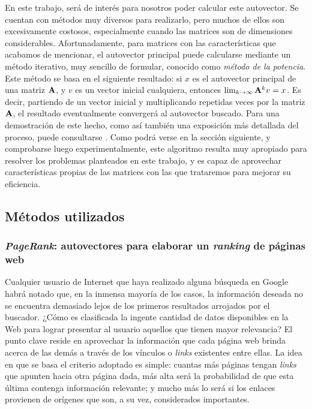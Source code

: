         En este trabajo, será de interés para nosotros poder calcular este autovector. Se cuentan con métodos muy diversos para realizarlo, pero muchos de ellos son excesivamente costosos, especialmente cuando las matrices son de dimensiones considerables. Afortunadamente, para matrices con las características que acabamos de mencionar, el autovector principal puede calcularse mediante un método iterativo, muy sencillo de formular, conocido como \emph{método de la potencia}. Este método se basa en el siguiente resultado: si $x$ es el autovector principal de una matriz $\mathbf{A}$, y $v$ es un vector inicial cualquiera, entonces $\lim_{k\to\infty}\mathbf{A}^k v = x$. Es decir, partiendo de un vector inicial y multiplicando repetidas veces por la matriz $\mathbf{A}$, el resultado eventualmente convergerá al autovector buscado. Para una demostración de este hecho, como así también una exposición más detallada del proceso, puede consultarse \cite[Sección 3]{Kamvar2003}. Como podrá verse en la sección siguiente, y comprobarse luego experimentalmente, este algoritmo resulta muy apropiado para resolver los problemas planteados en este trabajo, y es capaz de aprovechar características propias de las matrices con las que trataremos para mejorar su eficiencia.

    \subsection{Métodos utilizados}

        \subsubsection{\emph{PageRank}: autovectores para elaborar un \emph{ranking} de páginas web}

        Cualquier usuario de Internet que haya realizado alguna búsqueda en Google habrá notado que, en la inmensa mayoría de los casos, la información deseada no se encuentra demasiado lejos de los primeros resultados arrojados por el buscador. ¿Cómo es clasificada la ingente cantidad de datos disponibles en la Web para lograr presentar al usuario aquellos que tienen mayor relevancia? El punto clave reside en aprovechar la información que cada página web brinda acerca de las demás a través de los vínculos o \emph{links} existentes entre ellas. La idea en que se basa el criterio adoptado es simple: cuantas más páginas tengan \emph{links} que apunten hacia otra página dada, más alta será la probabilidad de que esta última contenga información relevante; y mucho más lo será si los enlaces provienen de orígenes que son, a su vez, considerados importantes.

